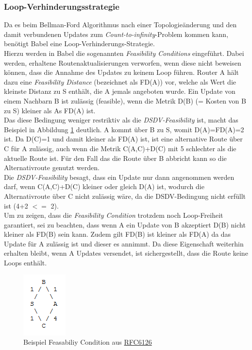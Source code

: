 \documentclass[10pt]{scrartcl}
\begin{document}
\subsubsection{Loop-Verhinderungsstrategie}
Da es beim Bellman-Ford Algorithmus nach einer Topologieänderung und den damit verbundenen Updates zum \textit{Count-to-infinity}-Problem kommen kann, benötigt Babel eine Loop-Verhinderungs-Strategie.\\
Hierzu werden in Babel die sogenannten \textit{Feasibility Conditions} eingeführt. Dabei werden, erhaltene Routenaktualisierungen verworfen, wenn diese nicht beweisen können, dass die Annahme des Updates zu keinem Loop führen. Router A hält dazu eine \textit{Feasibility Distance} (bezeichnet als FD(A)) vor, welche als Wert die kleinste Distanz zu S enthält, die A jemals angeboten wurde. Ein Update von einem Nachbarn B ist zulässig (feasible), wenn die Metrik D(B) (= Kosten von B zu S) kleiner als As FD(A) ist.\\
Das diese Bedingung weniger restriktiv als die \textit{DSDV-Feasibility} ist, macht das Beispiel in Abbildung \ref{fig:Feasibility} deutlich. A kommt über B zu S, womit D(A)=FD(A)=2 ist. Da D(C)=1 und damit kleiner als FD(A) ist, ist eine alternative Route über C für A zulässig, auch wenn die Metrik C(A,C)+D(C) mit 5 schlechter als die aktuelle Route ist. Für den Fall das die Route über B abbricht kann so die Alternativroute genutzt werden.\\
Die \textit{DSDV-Feasibility} besagt, dass ein Update nur dann angenommen werden darf, wenn C(A,C)+D(C) kleiner oder gleich D(A) ist, wodurch die Alternativroute über C nicht zulässig wäre, da die DSDV-Bedingung nicht erfüllt ist (4+2 $<=$ 2).\\
Um zu zeigen, dass die \textit{Feasibility Condition} trotzdem noch Loop-Freiheit garantiert, sei zu beachten, dass wenn A ein Update von B akzeptiert D(B) nicht kleiner als FD(B) sein kann. Zudem gilt FD(B) ist kleiner als FD(A) da das Update für A zulässig ist und dieser es annimmt. Da diese Eigenschaft weiterhin erhalten bleibt, wenn A Updates versendet, ist sichergestellt, dass die Route keine Loops enthält.

\begin{figure}[htbp]
	\centering	\includegraphics{Grafiken/Feasibility.png}
	\caption{Beispiel Feasabiliy Condition aus \href{http://tools.ietf.org/html/rfc6126}{RFC6126}}
	\label{fig:Feasibility}
\end{figure} 
\end{document}
